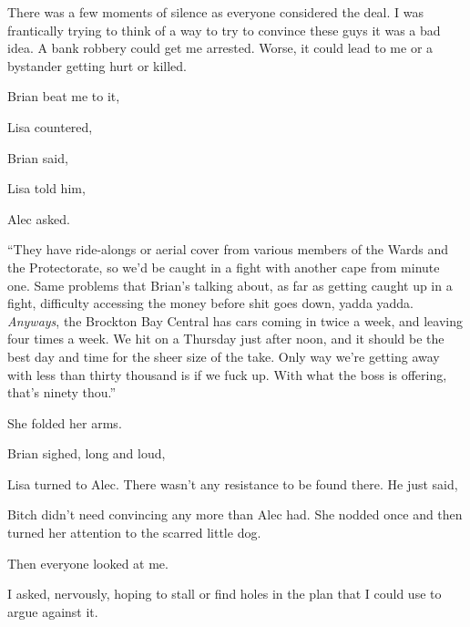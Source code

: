 There was a few moments of silence as everyone considered the deal. I was frantically trying to think of a way to try to convince these guys it was a bad idea. A bank robbery could get me arrested. Worse, it could lead to me or a bystander getting hurt or killed.

Brian beat me to it, 

 Lisa countered, 

 Brian said, 

 Lisa told him, 

 Alec asked.

“They have ride-alongs or aerial cover from various members of the Wards and the Protectorate, so we'd be caught in a fight with another cape from minute one. Same problems that Brian's talking about, as far as getting caught up in a fight, difficulty accessing the money before shit goes down, yadda yadda. {\em Anyways}, the Brockton Bay Central has cars coming in twice a week, and leaving four times a week. We hit on a Thursday just after noon, and it should be the best day and time for the sheer size of the take. Only way we're getting away with less than thirty thousand is if we fuck up. With what the boss is offering, that's ninety thou.”

She folded her arms.

Brian sighed, long and loud, 

Lisa turned to Alec. There wasn't any resistance to be found there. He just said, 

Bitch didn't need convincing any more than Alec had. She nodded once and then turned her attention to the scarred little dog.

Then everyone looked at me.

 I asked, nervously, hoping to stall or find holes in the plan that I could use to argue against it.


